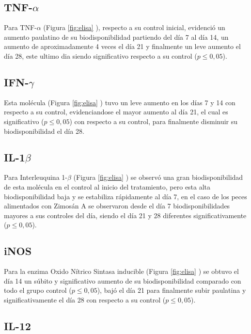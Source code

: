 \documentclass[12pt,letterpaper,oneside]{scrbook}
\begin{document}
\subsection{TNF-$\alpha$}

Para TNF-\(\alpha\) (Figura \ref{fig:elisa} ),
respecto a su control inicial, evidenció un aumento paulatino de su
biodisponibilidad partiendo del día 7 al día 14, un aumento de
aproximadamente 4 veces el día 21 y finalmente un leve aumento el día
28, este ultimo dia siendo significativo respecto a su control
(\(p \leq 0,05\)).

\subsection{IFN-$\gamma$}

Esta molécula (Figura \ref{fig:elisa} ) tuvo un
leve aumento en los días 7 y 14 con respecto a su control,
evidenciandose el mayor aumento al día 21, el cual es significativo
(\(p \leq 0,05\)) con respecto a su control, para finalmente disminuir
su biodisponibilidad el día 28.

\subsection{IL-1$\beta$}

Para Interleuquina 1-\(\beta\) (Figura \ref{fig:elisa}
) se observó una gran biodisponibilidad de esta
molécula en el control al inicio del tratamiento, pero esta alta
biodisponibilidad baja y se estabiliza rápidamente al día 7, en el caso
de los peces alimentados con Zimosán A se observaron desde el día 7
biodisponibilidades mayores a sus controles del día, siendo el día 21 y
28 diferentes significativamente (\(p \leq 0,05\)).

\subsection{iNOS}

Para la enzima Oxido Nítrico Sintasa inducible (Figura \ref{fig:elisa}
) se obtuvo el día 14 un súbito y significativo
aumento de su biodisponibilidad comparado con todo el grupo control
(\(p \leq 0,05\)), bajó el día 21 para finalmente subir paulatina y
significativamente el día 28 con respecto a su control
(\(p \leq 0,05\)).

\subsection{IL-12}
\end{document}
